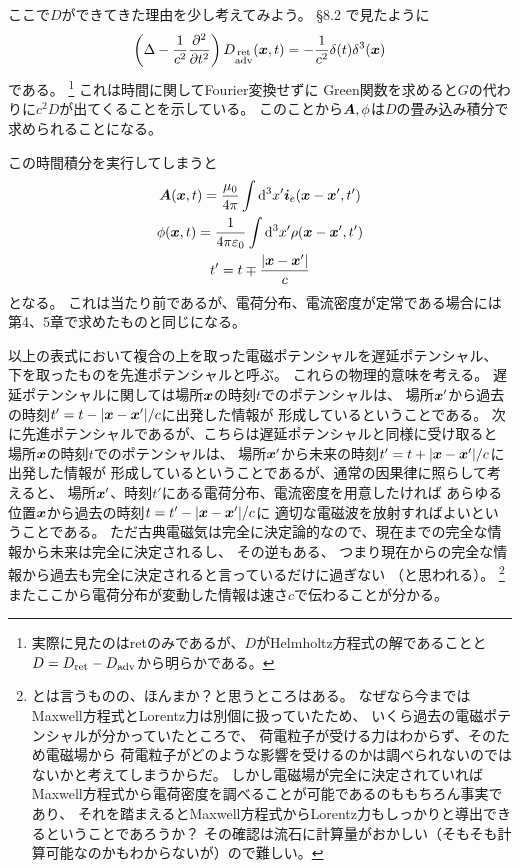 \documentclass[a4paper, 10pt]{jsarticle}
\theoremstyle{definition}
\def\vec#1{\mbox{\boldmath $#1$}}
\newcommand{\pdif}[2]{\frac{\partial #1}{\partial #2}}
\newcommand{\ddif}{{\rm d}}
\begin{document}
ここで$D$ができてきた理由を少し考えてみよう。
\S 8.2 で見たように
\begin{align}
	\left( \Delta - \frac{1}{c^2} \pdif{^2}{t^2} \right)
	D_{\substack{\rm ret \\ \rm adv}} (\vec{x}, t)
	= -\frac{1}{c^2} \delta(t) \delta^3(\vec{x})
\end{align}
である。
\footnote{実際に見たのはretのみであるが、$D$がHelmholtz方程式の解であることと
$D = D_{\rm ret} - D_{\rm adv}$から明らかである。}
これは時間に関してFourier変換せずに
Green関数を求めると$G$の代わりに$c^2 D$が出てくることを示している。
このことから$\vec{A}, \phi$は$D$の畳み込み積分で求められることになる。

この時間積分を実行してしまうと
\begin{gather}
	\vec{A}(\vec{x}, t) = \frac{\mu_0}{4\pi} \int \ddif^3 x'
	\vec{i}_e (\vec{x} - \vec{x}', t') \\
	\phi(\vec{x}, t) = \frac{1}{4\pi \varepsilon_0} \int \ddif^3 x'
	\rho (\vec{x} - \vec{x}', t') \\
	t' = t \mp \frac{|\vec{x} - \vec{x}'|}{c}
\end{gather}
となる。
これは当たり前であるが、電荷分布、電流密度が定常である場合には
第4、5章で求めたものと同じになる。

以上の表式において複合の上を取った電磁ポテンシャルを遅延ポテンシャル、
下を取ったものを先進ポテンシャルと呼ぶ。
これらの物理的意味を考える。
遅延ポテンシャルに関しては場所$\vec{x}$の時刻$t$でのポテンシャルは、
場所$\vec{x}'$から過去の時刻$t' = t - |\vec{x} - \vec{x}'|/c$に出発した情報が
形成しているということである。
次に先進ポテンシャルであるが、こちらは遅延ポテンシャルと同様に受け取ると
場所$\vec{x}$の時刻$t$でのポテンシャルは、
場所$\vec{x}'$から未来の時刻$t' = t + |\vec{x} - \vec{x}'|/c$に出発した情報が
形成しているということであるが、通常の因果律に照らして考えると、
場所$\vec{x}'$、時刻$t'$にある電荷分布、電流密度を用意したければ
あらゆる位置$\vec{x}$から過去の時刻$t = t' - |\vec{x} - \vec{x}'|/c$に
適切な電磁波を放射すればよいということである。
ただ古典電磁気は完全に決定論的なので、現在までの完全な情報から未来は完全に決定されるし、
その逆もある、
つまり現在からの完全な情報から過去も完全に決定されると言っているだけに過ぎない
（と思われる）。
\footnote{とは言うものの、ほんまか？と思うところはある。
なぜなら今まではMaxwell方程式とLorentz力は別個に扱っていたため、
いくら過去の電磁ポテンシャルが分かっていたところで、
荷電粒子が受ける力はわからず、そのため電磁場から
荷電粒子がどのような影響を受けるのかは調べられないのではないかと考えてしまうからだ。
しかし電磁場が完全に決定されていれば
Maxwell方程式から電荷密度を調べることが可能であるのももちろん事実であり、
それを踏まえるとMaxwell方程式からLorentz力もしっかりと導出できるということであろうか？
その確認は流石に計算量がおかしい（そもそも計算可能なのかもわからないが）ので難しい。}
またここから電荷分布が変動した情報は速さ$c$で伝わることが分かる。
\end{document}
